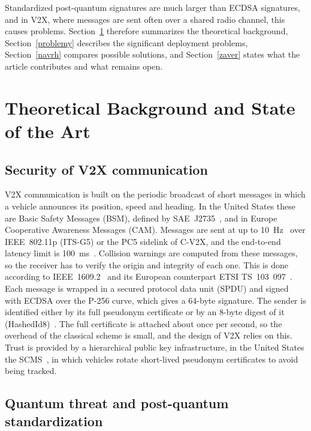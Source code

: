 \documentclass[10pt,twoside,a4paper]{article}
\begin{document}
Standardized post-quantum signatures are much larger than ECDSA signatures, and in V2X, where messages are sent often over a shared radio channel, this causes problems. Section~\ref{teoria} therefore summarizes the theoretical background, Section~\ref{problemy} describes the significant deployment problems, Section~\ref{navrh} compares possible solutions, and Section~\ref{zaver} states what the article contributes and what remains open.

\section{Theoretical Background and State of the Art} \label{teoria}

\subsection{Security of V2X communication}

V2X communication is built on the periodic broadcast of short messages in which a vehicle announces its position, speed and heading. In the United States these are Basic Safety Messages (BSM), defined by SAE~J2735~\cite{SAE:J2735}, and in Europe Cooperative Awareness Messages (CAM). Messages are sent at up to 10~Hz~\cite{Kenney:DSRC} over IEEE~802.11p (ITS-G5) or the PC5 sidelink of C-V2X, and the end-to-end latency limit is 100~ms~\cite{Abrar:2026}. Collision warnings are computed from these messages, so the receiver has to verify the origin and integrity of each one. This is done according to IEEE~1609.2~\cite{IEEE:1609.2} and its European counterpart ETSI TS~103~097~\cite{ETSI:103097}. Each message is wrapped in a secured protocol data unit (SPDU) and signed with ECDSA over the P-256 curve, which gives a 64-byte signature. The sender is identified either by its full pseudonym certificate or by an 8-byte digest of it (HashedId8)~\cite{Abrar:2026}. The full certificate is attached about once per second, so the overhead of the classical scheme is small, and the design of V2X relies on this. Trust is provided by a hierarchical public key infrastructure, in the United States the SCMS~\cite{Whyte:SCMS}, in which vehicles rotate short-lived pseudonym certificates to avoid being tracked.

\subsection{Quantum threat and post-quantum standardization}
\end{document}
